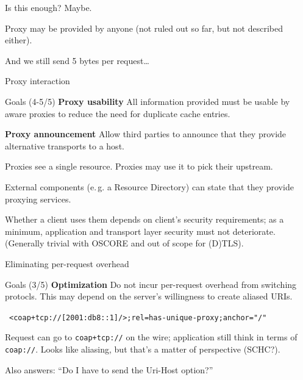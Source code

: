 \documentclass[aspectratio=169]{beamer}
\begin{document}
\begin{frame}{Is this enough?}
	\pause
	Maybe.

	\vspace{3cm}

	\pause
	Proxy may be provided by anyone (not ruled out so far, but not described either).
	
	\bigskip

	And we still send 5 bytes per request\ldots
\end{frame}

\begin{frame}{Proxy interaction}\large
	\begin{block}{Goals (4-5/5)}
		\textbf{Proxy usability} All information provided must be usable by aware proxies to reduce the need for duplicate cache entries.

		\textbf{Proxy announcement} Allow third parties to announce that they provide alternative transports to a host.
	\end{block}

	Proxies see a single resource. Proxies may use it to pick their upstream.

	\bigskip

	External components (e.\,g. a Resource Directory) can state that they provide proxying services.

	Whether a client uses them depends on client's security requirements;
	as a minimum, application and transport layer security must not deteriorate.
	(Generally trivial with OSCORE and out of scope for (D)TLS).
\end{frame}

\begin{frame}{Eliminating per-request overhead}\Large
	\begin{block}{Goals (3/5)}
		\textbf{Optimization} Do not incur per-request overhead from switching protocls. This may depend on the server's willingness to create aliased URIs.
	\end{block}

	\bigskip

	\mbox{
	\texttt{<coap+tcp://[2001:db8::1]/>;rel=}{\color{blue}\texttt{has-unique-proxy}}{\color{gray}\texttt{;anchor="/"}}
	}

	\bigskip

	Request can go to \texttt{coap+tcp://} on the wire; application still think in terms of \texttt{coap://}. Looks like aliasing, but that's a matter of perspective (SCHC?).

	\bigskip

	\footnotesize Also answers: ``Do I have to send the Uri-Host option?''
\end{frame}
\end{document}
